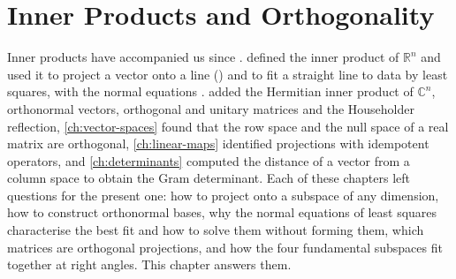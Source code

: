\chapter{Inner Products and Orthogonality}
\label{ch:inner-products}


Inner products have accompanied us since .  defined the inner product of $\mathbb R^n$ and used it to project a vector onto a line () and to fit a straight line to data by least squares, with the normal equations .  added the Hermitian inner product of $\mathbb C^n$, orthonormal vectors, orthogonal and unitary matrices and the Householder reflection, \cref{ch:vector-spaces} found that the row space and the null space of a real matrix are orthogonal, \cref{ch:linear-maps} identified projections with idempotent operators, and \cref{ch:determinants} computed the distance of a vector from a column space to obtain the Gram determinant. Each of these chapters left questions for the present one: how to project onto a subspace of any dimension, how to construct orthonormal bases, why the normal equations of least squares characterise the best fit and how to solve them without forming them, which matrices are orthogonal projections, and how the four fundamental subspaces fit together at right angles. This chapter answers them.

